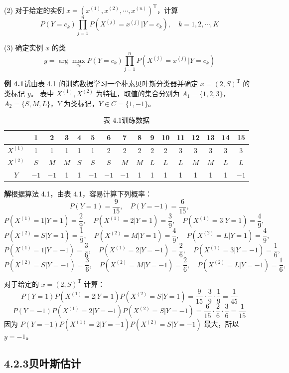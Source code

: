 \documentclass[UTF8,12pt,a4paper,fontset=fandol]{ctexart}
\begin{document}
(2) 对于给定的实例 $x=(x^{(1)},x^{(2)},\cdots,x^{(n)})^{\mathrm{T}}$，计算
\[
  P(Y=c_k)\prod_{j=1}^n P(X^{(j)}=x^{(j)}|Y=c_k),
  \quad k=1,2,\cdots,K
\]

(3) 确定实例 $x$ 的类
\[
  y=\arg\max_{c_k}P(Y=c_k)\prod_{j=1}^n P(X^{(j)}=x^{(j)}|Y=c_k)
\]

\noindent\textbf{例 4.1}\quad 试由表 4.1 的训练数据学习一个朴素贝叶斯分类器并确定 $x=(2,S)^{\mathrm{T}}$ 的类标记 $y$。
表中 $X^{(1)},X^{(2)}$ 为特征，取值的集合分别为 $A_1=\{1,2,3\}$，$A_2=\{S,M,L\}$，$Y$ 为类标记，$Y\in C=\{1,-1\}$。

\begin{table}[htbp]
\centering
\caption*{表 4.1\quad 训练数据}
\begin{tabular}{c|ccccccccccccccc}
\toprule
 & 1 & 2 & 3 & 4 & 5 & 6 & 7 & 8 & 9 & 10 & 11 & 12 & 13 & 14 & 15 \\
\midrule
$X^{(1)}$ & 1 & 1 & 1 & 1 & 1 & 2 & 2 & 2 & 2 & 2 & 3 & 3 & 3 & 3 & 3 \\
$X^{(2)}$ & $S$ & $M$ & $M$ & $S$ & $S$ & $S$ & $M$ & $M$ & $L$ & $L$ & $L$ & $M$ & $M$ & $L$ & $L$ \\
$Y$ & $-1$ & $-1$ & 1 & 1 & $-1$ & $-1$ & $-1$ & 1 & 1 & 1 & 1 & 1 & 1 & 1 & $-1$ \\
\bottomrule
\end{tabular}
\end{table}

\noindent\textbf{解}\quad 根据算法 4.1，由表 4.1，容易计算下列概率：
\[
  P(Y=1)=\frac{9}{15},\quad P(Y=-1)=\frac{6}{15},
\]
\[
  P(X^{(1)}=1|Y=1)=\frac{2}{9},\quad
  P(X^{(1)}=2|Y=1)=\frac{3}{9},\quad
  P(X^{(1)}=3|Y=1)=\frac{4}{9},
\]
\[
  P(X^{(2)}=S|Y=1)=\frac{1}{9},\quad
  P(X^{(2)}=M|Y=1)=\frac{4}{9},\quad
  P(X^{(2)}=L|Y=1)=\frac{4}{9},
\]
\[
  P(X^{(1)}=1|Y=-1)=\frac{3}{6},\quad
  P(X^{(1)}=2|Y=-1)=\frac{2}{6},\quad
  P(X^{(1)}=3|Y=-1)=\frac{1}{6},
\]
\[
  P(X^{(2)}=S|Y=-1)=\frac{3}{6},\quad
  P(X^{(2)}=M|Y=-1)=\frac{2}{6},\quad
  P(X^{(2)}=L|Y=-1)=\frac{1}{6},
\]

对于给定的 $x=(2,S)^{\mathrm{T}}$ 计算：
\[
  P(Y=1)P(X^{(1)}=2|Y=1)P(X^{(2)}=S|Y=1)
  =\frac{9}{15}\cdot\frac{3}{9}\cdot\frac{1}{9}
  =\frac{1}{45}
\]
\[
  P(Y=-1)P(X^{(1)}=2|Y=-1)P(X^{(2)}=S|Y=-1)
  =\frac{6}{15}\cdot\frac{2}{6}\cdot\frac{3}{6}
  =\frac{1}{15}
\]
因为 $P(Y=-1)P(X^{(1)}=2|Y=-1)P(X^{(2)}=S|Y=-1)$ 最大，所以 $y=-1$。

\subsection*{4.2.3\quad 贝叶斯估计}
\end{document}
